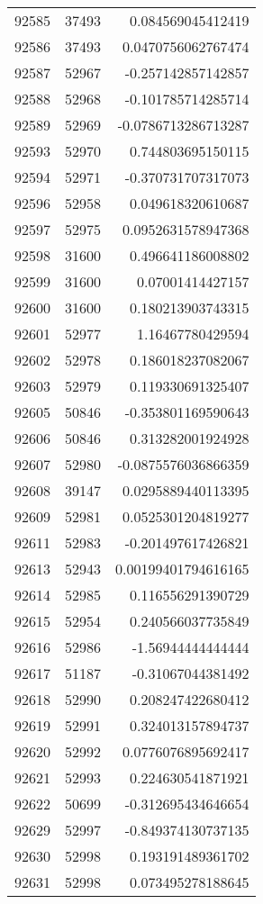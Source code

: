 \begin{tabular}{r | r | r}
92585 & 37493 & 0.084569045412419 \\
92586 & 37493 & 0.0470756062767474 \\
92587 & 52967 & -0.257142857142857 \\
92588 & 52968 & -0.101785714285714 \\
92589 & 52969 & -0.0786713286713287 \\
92593 & 52970 & 0.744803695150115 \\
92594 & 52971 & -0.370731707317073 \\
92596 & 52958 & 0.049618320610687 \\
92597 & 52975 & 0.0952631578947368 \\
92598 & 31600 & 0.496641186008802 \\
92599 & 31600 & 0.07001414427157 \\
92600 & 31600 & 0.180213903743315 \\
92601 & 52977 & 1.16467780429594 \\
92602 & 52978 & 0.186018237082067 \\
92603 & 52979 & 0.119330691325407 \\
92605 & 50846 & -0.353801169590643 \\
92606 & 50846 & 0.313282001924928 \\
92607 & 52980 & -0.0875576036866359 \\
92608 & 39147 & 0.0295889440113395 \\
92609 & 52981 & 0.0525301204819277 \\
92611 & 52983 & -0.201497617426821 \\
92613 & 52943 & 0.00199401794616165 \\
92614 & 52985 & 0.116556291390729 \\
92615 & 52954 & 0.240566037735849 \\
92616 & 52986 & -1.56944444444444 \\
92617 & 51187 & -0.31067044381492 \\
92618 & 52990 & 0.208247422680412 \\
92619 & 52991 & 0.324013157894737 \\
92620 & 52992 & 0.0776076895692417 \\
92621 & 52993 & 0.224630541871921 \\
92622 & 50699 & -0.312695434646654 \\
92629 & 52997 & -0.849374130737135 \\
92630 & 52998 & 0.193191489361702 \\
92631 & 52998 & 0.073495278188645 \\

\end{tabular}
